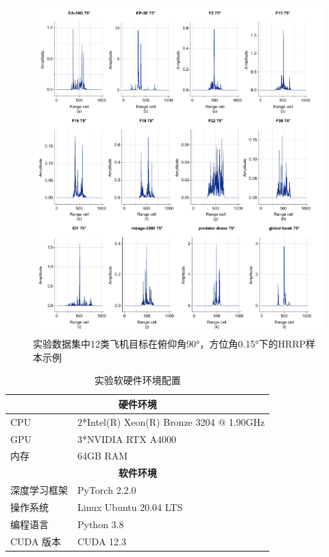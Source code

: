 \begin{figure}[h!]
    \centering
    \includegraphics[width=\linewidth]{figures/hrrp_samples.pdf} %
    \caption{实验数据集中12类飞机目标在俯仰角90°，方位角0.15°下的HRRP样本示例}
    \label{fig:dataset_chap3}
\end{figure}

\begin{table}[htbp] %
\centering
\caption{实验软硬件环境配置}
\label{tab:exp_env_config}
\begin{tabular}{l|l} %
\hline
\multicolumn{2}{c}{\textbf{硬件环境}} \\ %
\hline
CPU & 2*Intel(R) Xeon(R) Bronze 3204 @ 1.90GHz \\
\hline
GPU & 3*NVIDIA RTX A4000 \\
\hline
内存 & 64GB RAM \\
\hline
\multicolumn{2}{c}{\textbf{软件环境}} \\ %
\hline
深度学习框架 & PyTorch 2.2.0 \\
\hline
操作系统 & Linux Ubuntu 20.04 LTS \\
\hline
编程语言 & Python 3.8 \\
\hline
CUDA 版本 & CUDA 12.3 \\
\hline
\end{tabular}
\end{table}

